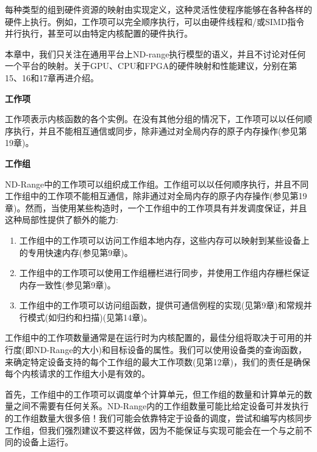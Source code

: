 每种类型的组到硬件资源的映射由实现定义，这种灵活性使程序能够在各种各样的硬件上执行。例如，工作项可以完全顺序执行，可以由硬件线程和/或SIMD指令并行执行，甚至可以由特定内核配置的硬件执行。\par

本章中，我们只关注在通用平台上ND-range执行模型的语义，并且不讨论对任何一个平台的映射。关于GPU、CPU和FPGA的硬件映射和性能建议，分别在第15、16和17章再进介绍。\par

\hspace*{\fill} \par %
\textbf{工作项}

工作项表示内核函数的各个实例。在没有其他分组的情况下，工作项可以以任何顺序执行，并且不能相互通信或同步，除非通过对全局内存的原子内存操作(参见第19章)。\par

\hspace*{\fill} \par %
\textbf{工作组}

ND-Range中的工作项可以组织成工作组。工作组可以以任何顺序执行，并且不同工作组中的工作项不能相互通信，除非通过对全局内存的原子内存操作(参见第19章)。然而，当使用某些构造时，一个工作组中的工作项具有并发调度保证，并且这种局部性提供了额外的能力:\par

\begin{enumerate}
	\item 工作组中的工作项可以访问工作组本地内存，这些内存可以映射到某些设备上的专用快速内存(参见第9章)。
	\item 工作组中的工作项可以使用工作组栅栏进行同步，并使用工作组内存栅栏保证内存一致性(参见第9章)。
	\item 工作组中的工作项可以访问组函数，提供可通信例程的实现(见第9章)和常规并行模式(如归约和扫描)(见第14章)。
\end{enumerate}

工作组中的工作项数量通常是在运行时为内核配置的，最佳分组将取决于可用的并行度(即ND-Range的大小)和目标设备的属性。我们可以使用设备类的查询函数，来确定特定设备支持的每个工作组的最大工作项数(见第12章)，我们的责任是确保每个内核请求的工作组大小是有效的。\par

首先，工作组中的工作项可以调度单个计算单元，但工作组的数量和计算单元的数量之间不需要有任何关系。ND-Range内的工作组数量可能比给定设备可并发执行的工作组数量大很多倍！我们可能会依靠特定于设备的调度，尝试和编写内核同步工作组，但我们强烈建议不要这样做，因为不能保证与实现可能会在一个与之前不同的设备上运行。\par

